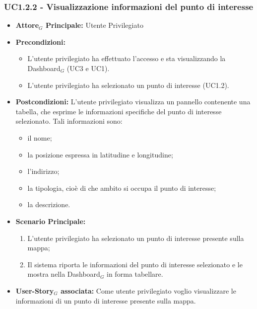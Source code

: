 \documentclass[11pt]{article}
\begin{document}
\begin{justify}
 \subsubsection{\textbf{UC1.2.2 - Visualizzazione informazioni del punto di interesse}}
 \label{UC1.2.2}
 \begin{itemize}
     \item \textbf{Attore$_G$ Principale:} Utente Privilegiato
     \item \textbf{Precondizioni:}
       \begin{itemize}
            \item L'utente privilegiato ha effettuato l'accesso e sta visualizzando la Dashboard$_G$ (UC3 e UC1).
            \item L'utente privilegiato ha selezionato un punto di interesse (UC1.2).
       \end{itemize}
     \item \textbf{Postcondizioni:} L'utente privilegiato visualizza un pannello contenente una tabella, che esprime le informazioni specifiche del punto di interesse selezionato. Tali informazioni sono:
       \begin{itemize}
       \item il nome;
       \item la posizione espressa in latitudine e longitudine;
       \item l'indirizzo;
       \item la tipologia, cioè di che ambito si occupa il punto di interesse;
       \item la descrizione.
       \end{itemize}
     \item \textbf{Scenario Principale:}
        \begin{enumerate}
          \item L'utente privilegiato ha selezionato un punto di interesse presente sulla mappa;
            \item Il sistema riporta le informazioni del punto di interesse selezionato e le mostra nella Dashboard$_G$ in forma tabellare.
        \end{enumerate}
     \item \textbf{User-Story$_G$ associata:} Come utente privilegiato voglio visualizzare le informazioni di un punto di interesse presente sulla mappa. 
 \end{itemize}




\end{justify}
\end{document}
